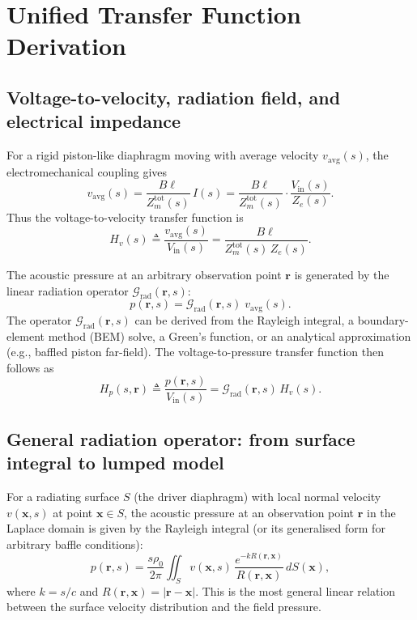 

\newpage
\section{Unified Transfer Function Derivation}

\subsection{Voltage-to-velocity, radiation field, and electrical impedance}

For a rigid piston-like diaphragm moving with average velocity \(v_{\mathrm{avg}}(s)\), the electromechanical coupling gives
\[
v_{\mathrm{avg}}(s)=\frac{B\ell}{Z_m^{\mathrm{tot}}(s)}\,I(s)
=\frac{B\ell}{Z_m^{\mathrm{tot}}(s)}\cdot\frac{V_{\mathrm{in}}(s)}{Z_e(s)}.
\]
Thus the voltage-to-velocity transfer function is
\[
H_v(s)\triangleq\frac{v_{\mathrm{avg}}(s)}{V_{\mathrm{in}}(s)}
=\frac{B\ell}{Z_m^{\mathrm{tot}}(s)\,Z_e(s)}.
\]

The acoustic pressure at an arbitrary observation point \(\mathbf{r}\) is generated by the linear radiation operator \(\mathcal{G}_{\mathrm{rad}}(\mathbf{r},s)\):
\[
p(\mathbf{r},s)=\mathcal{G}_{\mathrm{rad}}(\mathbf{r},s)\;v_{\mathrm{avg}}(s).
\]
The operator \(\mathcal{G}_{\mathrm{rad}}(\mathbf{r},s)\) can be derived from the Rayleigh integral, a boundary-element method (BEM) solve, a Green's function, or an analytical approximation (e.g., baffled piston far-field). The voltage-to-pressure transfer function then follows as
\[
H_p(s,\mathbf{r})\triangleq\frac{p(\mathbf{r},s)}{V_{\mathrm{in}}(s)}
=\mathcal{G}_{\mathrm{rad}}(\mathbf{r},s)\,H_v(s).
\]

\subsection{General radiation operator: from surface integral to lumped model}

For a radiating surface \(S\) (the driver diaphragm) with local normal velocity \(v(\mathbf{x},s)\) at point \(\mathbf{x}\in S\), the acoustic pressure at an observation point \(\mathbf{r}\) in the Laplace domain is given by the Rayleigh integral (or its generalised form for arbitrary baffle conditions):
\[
\boxed{
p(\mathbf{r},s) = \frac{s\rho_0}{2\pi} \iint_S v(\mathbf{x},s) \, \frac{e^{-k R(\mathbf{r},\mathbf{x})}}{R(\mathbf{r},\mathbf{x})} \, dS(\mathbf{x})
},
\]
where \(k = s/c\) and \(R(\mathbf{r},\mathbf{x}) = |\mathbf{r} - \mathbf{x}|\). This is the most general linear relation between the surface velocity distribution and the field pressure.

